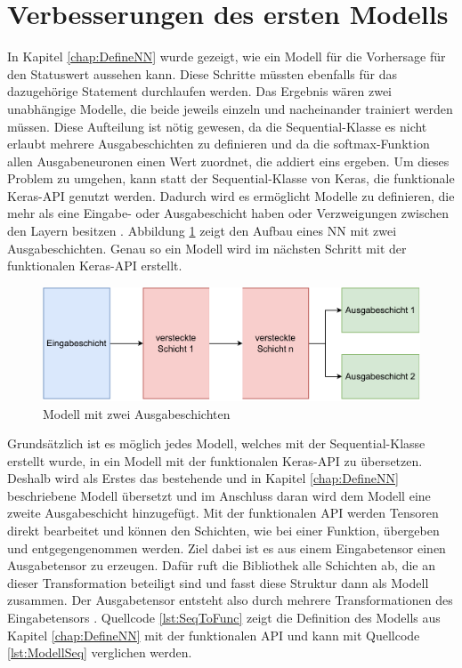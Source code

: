 \section{Verbesserungen des ersten Modells}
\label{chap:VerbesserungenNN}

In Kapitel \ref*{chap:DefineNN} wurde gezeigt, wie ein Modell für die Vorhersage für den Statuswert aussehen kann. Diese Schritte müssten ebenfalls für das dazugehörige Statement
durchlaufen werden. Das Ergebnis wären zwei unabhängige Modelle, die beide jeweils einzeln und nacheinander trainiert werden müssen. Diese Aufteilung ist nötig gewesen,
da die \glqq Sequential\grqq{}-Klasse es nicht erlaubt mehrere Ausgabeschichten zu definieren und da die \glqq softmax\grqq{}-Funktion allen Ausgabeneuronen 
einen Wert zuordnet, die addiert eins ergeben. Um dieses Problem zu umgehen, kann statt der \glqq Sequential\grqq{}-Klasse von Keras, die funktionale Keras-\ac{API} genutzt werden. 
Dadurch wird es ermöglicht Modelle zu definieren, die mehr als eine Eingabe- oder Ausgabeschicht haben oder Verzweigungen zwischen den Layern besitzen \cite[vgl. S.299f.]{DL_PY}. 
Abbildung \ref*{fig:FunktionaleAPI} zeigt den Aufbau eines \ac{NN} mit zwei Ausgabeschichten. Genau so ein Modell wird im nächsten Schritt mit der funktionalen Keras-\ac{API} erstellt.

\begin{figure}[H]
    \centering
    \includegraphics[width=\textwidth]{abbildungen/NN_funktionaleAPI.pdf}
    \caption{Modell mit zwei Ausgabeschichten}
    \label{fig:FunktionaleAPI}
\end{figure}

Grundsätzlich ist es möglich jedes Modell, welches mit der \glqq Sequential\grqq{}-Klasse erstellt wurde, in ein Modell mit der funktionalen Keras-\ac{API} zu übersetzen. 
Deshalb wird als Erstes das bestehende und in Kapitel \ref*{chap:DefineNN} beschriebene Modell übersetzt und im Anschluss daran wird dem Modell eine zweite Ausgabeschicht
hinzugefügt.
Mit der funktionalen \ac{API} werden Tensoren direkt bearbeitet und können den Schichten, wie bei einer Funktion, übergeben und entgegengenommen werden. Ziel dabei ist es 
aus einem Eingabetensor einen Ausgabetensor zu erzeugen. Dafür ruft die Bibliothek alle Schichten ab, die an dieser Transformation beteiligt sind und fasst diese Struktur
dann als Modell zusammen. Der Ausgabetensor entsteht also durch mehrere Transformationen des Eingabetensors \cite[vgl. S.305]{DL_PY}. 
Quellcode \ref*{lst:SeqToFunc} zeigt die Definition des Modells aus Kapitel \ref*{chap:DefineNN} mit der funktionalen \ac{API} und kann mit Quellcode \ref*{lst:ModellSeq}
verglichen werden. 

